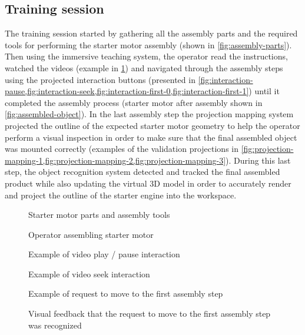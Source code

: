 \subsection{Training session}

The training session started by gathering all the assembly parts and the required tools for performing the starter motor assembly (shown in \cref{fig:assembly-parts}). Then using the immersive teaching system, the operator read the instructions, watched the videos (example in \cref{fig:assembly}) and navigated through the assembly steps using the projected interaction buttons (presented in \cref{fig:interaction-pause,fig:interaction-seek,fig:interaction-first-0,fig:interaction-first-1}) until it completed the assembly process (starter motor after assembly shown in \cref{fig:assembled-object}). In the last assembly step the projection mapping system projected the outline of the expected starter motor geometry to help the operator perform a visual inspection in order to make sure that the final assembled object was mounted correctly (examples of the validation projections in \cref{fig:projection-mapping-1,fig:projection-mapping-2,fig:projection-mapping-3}). During this last step, the object recognition system detected and tracked the final assembled product while also updating the virtual 3D model in order to accurately render and project the outline of the starter engine into the workspace.

\begin{figure}[H]
	\begin{floatrow}[2]
		{\caption{Starter motor parts and assembly tools}\label{fig:assembly-parts}}
		{\caption{Operator assembling starter motor}\label{fig:assembly}}
	\end{floatrow}
\end{figure}

\begin{figure}[H]
	\begin{floatrow}[4]
		{\caption{Example of video play / pause interaction}\label{fig:interaction-pause}}
		{\caption{Example of video seek interaction}\label{fig:interaction-seek}}
		{\caption{Example of request to move to the first assembly step}\label{fig:interaction-first-0}}
		{\caption{Visual feedback that the request to move to the first assembly step was recognized}\label{fig:interaction-first-1}}
	\end{floatrow}
\end{figure}

